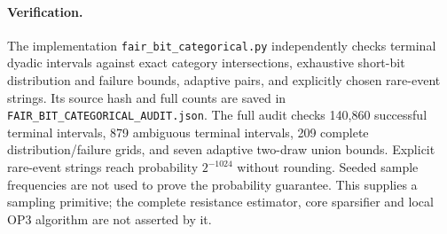 \paragraph{Verification.}
The implementation \texttt{fair\_bit\_categorical.py} independently
checks terminal dyadic intervals against exact category intersections,
exhaustive short-bit distribution and failure bounds, adaptive pairs,
and explicitly chosen rare-event strings. Its source hash and full
counts are saved in \texttt{FAIR\_BIT\_CATEGORICAL\_AUDIT.json}.
The full audit checks 140,860 successful terminal intervals, 879
ambiguous terminal intervals, 209 complete distribution/failure grids,
and seven adaptive two-draw union bounds. Explicit rare-event strings
reach probability $2^{-1024}$ without rounding. Seeded sample frequencies
are not used to prove the probability guarantee.
This supplies a sampling primitive; the complete resistance estimator,
core sparsifier and local OP3 algorithm are not asserted by it.
